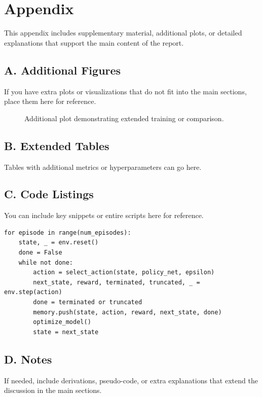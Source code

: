 \appendix
\section*{Appendix}

This appendix includes supplementary material, additional plots, or detailed explanations
that support the main content of the report.

\subsection*{A. Additional Figures}

If you have extra plots or visualizations that do not fit into the main sections,
place them here for reference.

\begin{figure}[h]
    \centering
    \fbox{\rule{0pt}{2in}\rule{0.75\linewidth}{0pt}}
    \caption{Additional plot demonstrating extended training or comparison.}
    \label{fig:appendix-example}
\end{figure}

\subsection*{B. Extended Tables}

Tables with additional metrics or hyperparameters can go here.

\subsection*{C. Code Listings}

You can include key snippets or entire scripts here for reference.

\begin{lstlisting}[caption={Example training loop}, label={lst:train-loop}]
for episode in range(num_episodes):
    state, _ = env.reset()
    done = False
    while not done:
        action = select_action(state, policy_net, epsilon)
        next_state, reward, terminated, truncated, _ = env.step(action)
        done = terminated or truncated
        memory.push(state, action, reward, next_state, done)
        optimize_model()
        state = next_state
\end{lstlisting}

\subsection*{D. Notes}

If needed, include derivations, pseudo-code, or extra explanations that extend the discussion
in the main sections.
